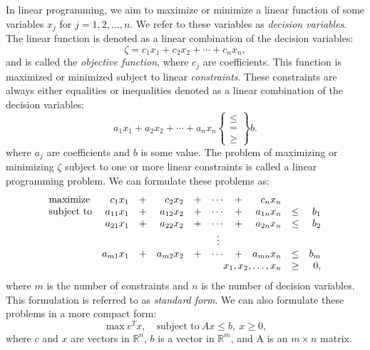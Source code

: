 
In linear programming, we aim to maximize or minimize a linear function of
some variables $x_j$ for $j=1,2,\ldots,n$. We refer to these variables as
\textit{decision variables}. The linear function is denoted as a linear
combination of the decision variables:
\[
\zeta = c_1 x_1 + c_2 x_2 + \cdots + c_n x_n,
\]
and is called the \textit{objective function}, where $c_j$
are coefficients.
This function is maximized
or minimized subject to linear \textit{constraints}. These constraints are
always either equalities or inequalities denoted as a linear combination
of the decision variables:
\[
a_1x_1 + a_2 x_2 + \cdots + a_n x_n \left\{\begin{array}{c} \leq \\ = \\ \geq \end{array}\right\} b.
\]
where $a_j$ are coefficients and $b$ is some value.
The problem of maximizing or minimizing $\zeta$ subject to one or more
linear constraints is called a linear programming problem.
We can formulate these problems as:
\[
\begin{array}{lrcrcccrcr}
\textrm{maximize}   & c_1 x_1    &+& c_2 x_2    &+& \cdots &+& c_n x_n               \\
\textrm{subject to} & a_{11} x_1 &+& a_{12} x_2 &+& \cdots &+& a_{1n} x_n &\leq& b_1 \\
                    & a_{21} x_1 &+& a_{22} x_2 &+& \cdots &+& a_{2n} x_n &\leq& b_2 \\
                    &            & &            & & \vdots & &            &    &     \\
                    & a_{m1} x_1 &+& a_{m2} x_2 &+& \cdots &+& a_{mn} x_n &\leq& b_m \\
                    \multicolumn{8}{r}{x_1,x_2,\ldots,x_n} &\geq& 0,
\end{array}
\]
where $m$ is the number of constraints and $n$ is the number of decision variables.
This formulation is referred to as \textit{standard form}\cite{vanderbei}.
We can also formulate these problems in a more compact form:
\begin{equation}
\max{c^T x},\quad \textrm{subject to}~Ax \leq b, ~ x \geq 0, \label{eq:primal}
\end{equation}
where $c$ and $x$ are vectors in $\mathbb{R}^n$, $b$ is a vector in $\mathbb{R}^m$, and
A is an $m \times n$ matrix.

